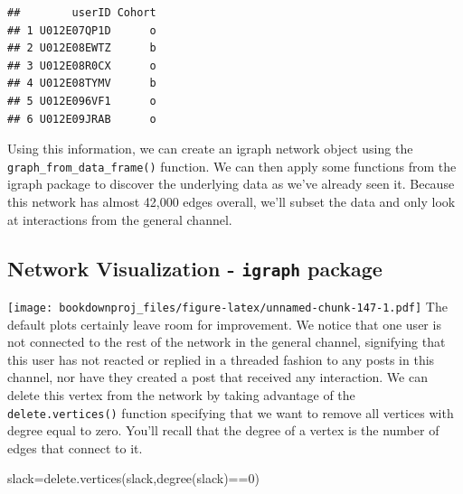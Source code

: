 \documentclass[
]{article}
\newenvironment{Shaded}{\begin{snugshade}}{\end{snugshade}}
\newcommand{\AttributeTok}[1]{\textcolor[rgb]{0.77,0.63,0.00}{#1}}
\newcommand{\ConstantTok}[1]{\textcolor[rgb]{0.00,0.00,0.00}{#1}}
\newcommand{\DecValTok}[1]{\textcolor[rgb]{0.00,0.00,0.81}{#1}}
\newcommand{\FunctionTok}[1]{\textcolor[rgb]{0.00,0.00,0.00}{#1}}
\newcommand{\NormalTok}[1]{#1}
\newcommand{\OtherTok}[1]{\textcolor[rgb]{0.56,0.35,0.01}{#1}}
\newcommand{\SpecialCharTok}[1]{\textcolor[rgb]{0.00,0.00,0.00}{#1}}
\newcommand{\StringTok}[1]{\textcolor[rgb]{0.31,0.60,0.02}{#1}}
\theoremstyle{definition}
\theoremstyle{definition}
\theoremstyle{definition}
\theoremstyle{definition}
\theoremstyle{remark}
\begin{document}
\begin{verbatim}
##        userID Cohort
## 1 U012E07QP1D      o
## 2 U012E08EWTZ      b
## 3 U012E08R0CX      o
## 4 U012E08TYMV      b
## 5 U012E096VF1      o
## 6 U012E09JRAB      o
\end{verbatim}

Using this information, we can create an igraph network object using the \texttt{graph\_from\_data\_frame()} function. We can then apply some functions from the igraph package to discover the underlying data as we've already seen it. Because this network has almost 42,000 edges overall, we'll subset the data and only look at interactions from the general channel.

\hypertarget{network-visualization---igraph-package}{%
\subsection{\texorpdfstring{Network Visualization - \texttt{igraph} package}{Network Visualization - igraph package}}\label{network-visualization---igraph-package}}

\begin{Shaded}
\end{Shaded}

\texttt{[image: bookdownproj\_files/figure-latex/unnamed-chunk-147-1.pdf]}
The default plots certainly leave room for improvement. We notice that one user is not connected to the rest of the network in the general channel, signifying that this user has not reacted or replied in a threaded fashion to any posts in this channel, nor have they created a post that received any interaction. We can delete this vertex from the network by taking advantage of the \texttt{delete.vertices()} function specifying that we want to remove all vertices with degree equal to zero. You'll recall that the degree of a vertex is the number of edges that connect to it.

\begin{Shaded}
\begin{Highlighting}[]
\NormalTok{slack}\OtherTok{=}\FunctionTok{delete.vertices}\NormalTok{(slack,}\FunctionTok{degree}\NormalTok{(slack)}\SpecialCharTok{==}\DecValTok{0}\NormalTok{)}
\end{Highlighting}
\end{Shaded}
\end{document}
